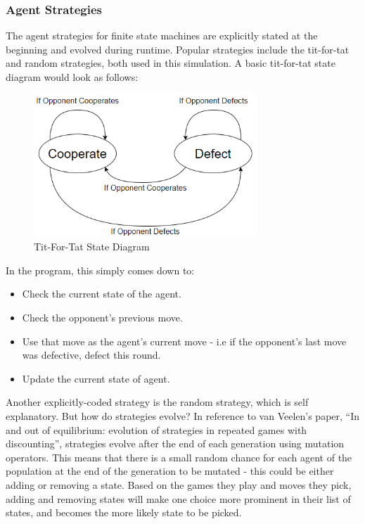 \documentclass[12pt,a4paper]{article}
\begin{document}
\subsubsection{Agent Strategies}
The agent strategies for finite state machines are explicitly stated at the beginning and evolved during runtime. Popular strategies include the tit-for-tat and random strategies, both used in this simulation. A basic tit-for-tat state diagram would look as follows:

\begin{figure}[H]
	\centering
		\includegraphics[width=0.75\textwidth]{TitForTatStates}
		\caption{Tit-For-Tat State Diagram}
\end{figure}

In the program, this simply comes down to:

\begin{itemize}
  \item Check the current state of the agent.
  \item Check the opponent's previous move.
  \item Use that move as the agent's current move - i.e if the opponent's last move was defective, defect this round.
  \item Update the current state of agent.
\end{itemize}

Another explicitly-coded strategy is the random strategy, which is self explanatory. But how do strategies evolve? In reference to van Veelen's paper, “In and out of equilibrium: evolution of strategies in repeated games with discounting”\cite{46}, strategies evolve after the end of each generation using mutation operators. This means that there is a small random chance for each agent of the population at the end of the generation to be mutated - this could be either adding or removing a state. Based on the games they play and moves they pick, adding and removing states will make one choice more prominent in their list of states, and becomes the more likely state to be picked.
\end{document}
